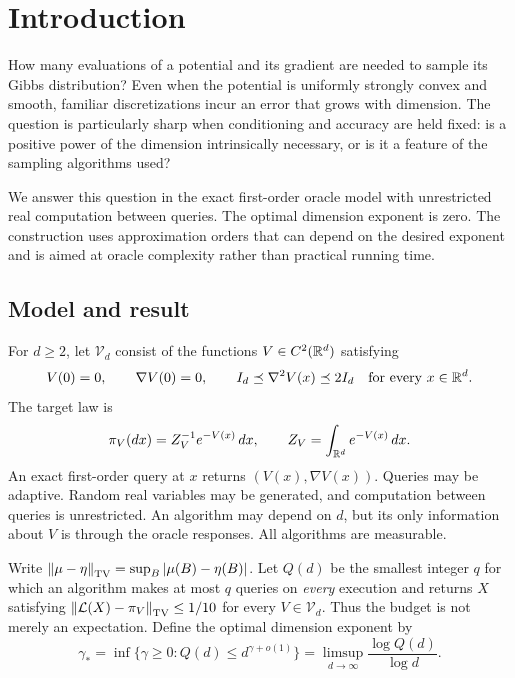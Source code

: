 \section{Introduction}\label{sec:introduction}

How many evaluations of a potential and its gradient are needed
to sample its Gibbs distribution? Even when the potential is
uniformly strongly convex and smooth, familiar discretizations
incur an error that grows with dimension. The question is
particularly sharp when conditioning and accuracy are held fixed:
is a positive power of the dimension intrinsically necessary,
or is it a feature of the sampling algorithms used?

We answer this question in the exact first-order oracle model
with unrestricted real computation between queries. The optimal
dimension exponent is zero. The construction uses approximation
orders that can depend on the desired exponent and is aimed at
oracle complexity rather than practical running time.

\subsection{Model and result}

For \(d\ge2\), let \(\mathcal V_d\) consist of the functions
\(V\in C^2(\mathbb R^d)\) satisfying
\begin{equation}\label{eq:original-class}
 V(0)=0,\qquad \nabla V(0)=0,\qquad
 I_d\preceq\nabla^2V(x)\preceq2I_d
                         \quad\text{for every }x\in\mathbb R^d.
\end{equation}
The target law is
\[
 \pi_V(dx)=Z_V^{-1}e^{-V(x)}\,dx,\qquad
 Z_V=\int_{\mathbb R^d}e^{-V(x)}\,dx.
\]
An exact first-order query at \(x\) returns
\((V(x),\nabla V(x))\). Queries may be adaptive.
Random real variables may be generated, and computation
between queries is unrestricted. An algorithm may depend
on \(d\), but its only information about \(V\) is through
the oracle responses. All algorithms are measurable.

Write \(\left\|\mu-\eta\right\|_{\operatorname{TV}}=\sup_B|\mu(B)-\eta(B)|\).
Let \(Q(d)\) be the smallest integer \(q\) for which
an algorithm makes at most \(q\) queries on \emph{every}
execution and returns \(X\) satisfying
\(\left\|\mathcal L(X)-\pi_V\right\|_{\operatorname{TV}}\le1/10\) for
every \(V\in\mathcal V_d\). Thus the budget is not
merely an expectation. Define the optimal dimension exponent
by
\[
 \gamma_*=\inf\{\gamma\ge0:Q(d)\le d^{\gamma+o(1)}\}
          =\limsup_{d\to\infty}\frac{\log Q(d)}{\log d}.
\]

